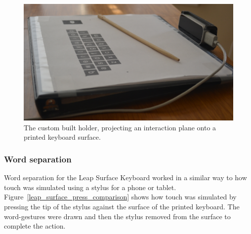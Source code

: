 \begin{figure}[h]
	\centering
	\includegraphics[width=5in]{Figures/fig_leap_holder}
	\caption[Leap Surface Holder]{The custom built holder, projecting an interaction plane onto a printed keyboard surface.}
	\label{fig_leap_holder}
\end{figure}

\subsubsection{Word separation}
Word separation for the Leap Surface Keyboard worked in a similar way to how touch was simulated using a stylus for a phone or tablet. Figure~\ref{leap_surface_press_comparison} shows how touch was simulated by pressing the tip of the stylus against the surface of the printed keyboard. The word-gestures were drawn and then the stylus removed from the surface to complete the action.

